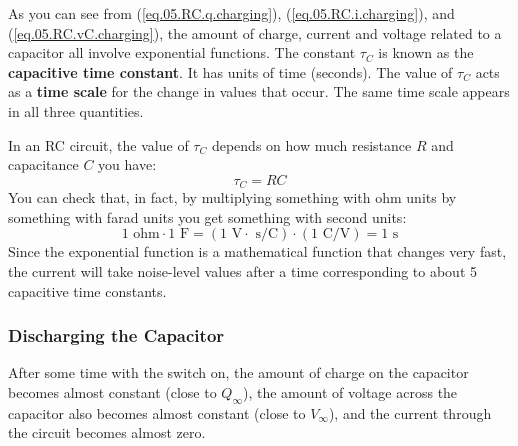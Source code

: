 As you can see from (\ref{eq.05.RC.q.charging}), (\ref{eq.05.RC.i.charging}), and (\ref{eq.05.RC.vC.charging}), the amount of charge, current and voltage related to a capacitor all involve exponential functions. The constant $\tau_{C}$ is known as the \textbf{capacitive time constant}. It has units of time (seconds). The value of $\tau_{C}$ acts as a \textbf{time scale} for the change in values that occur. The same time scale appears in all three quantities.

In an RC circuit, the value of $\tau_{C}$ depends on how much resistance $R$ and capacitance $C$ you have:
\begin{equation}
    \tau_{C} = R C
    \label{eq.05.tauC}
\end{equation}
You can check that, in fact, by multiplying something with ohm units by something with farad units you get something with second units:
\begin{equation}
    1 \text{ ohm} \cdot 1 \text{ F} = \left(1 \text{ V}\cdot\text{ s/C}\right) \cdot \left(1 \text{ C/V}\right) = 1 \text{ s}
\end{equation}
Since the exponential function is a mathematical function that changes very fast, the current will take noise-level values after a time corresponding to about 5 capacitive time constants.
%
\subsubsection{Discharging the Capacitor}
%
After some time with the switch on, the amount of charge on the capacitor becomes almost constant (close to $Q_{\infty}$), the amount of voltage across the capacitor also becomes almost constant (close to $V_{\infty}$), and the current through the circuit becomes almost zero.

